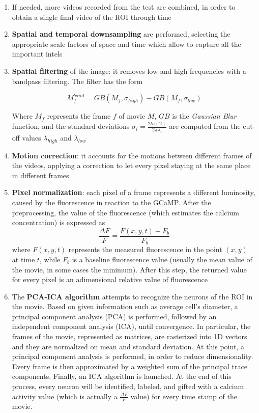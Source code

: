 \documentclass[a4paper]{article}
\begin{document}
\begin{enumerate}
	
	\item If needed, more videos recorded from the test are combined, in order to obtain a single final video of the ROI through time
	
	\item \textbf{Spatial and temporal downsampling} are performed, selecting the appropriate scale factors of space and time which allow to capture all the important intels
	
	\item \textbf{Spatial filtering} of the image: it removes low and high frequencies with a bandpass filtering. The filter has the form
	
	$$ M_f^{band} = GB(M_f,\sigma_{high}) - GB(M_f,\sigma_{low})$$
	
	Where $M_f$  represents the frame $f$ of movie $M$, $GB$ is the \textit{Gaussian Blur} function, and the standard deviations $ \sigma_i = \frac{2 ln(2)}{2 \pi \lambda_i}$ are computed from the cut-off values $ \lambda_{high}$ and $ \lambda_{low}$
	
	\item \textbf{Motion correction}: it accounts for the motions between different frames of the videos, applying a correction to let every pixel staying at the same place in different frames
	
	\item \textbf{Pixel normalization}: each pixel of a frame represents a different luminosity, caused by the fluorescence in reaction to the GCaMP. After the preprocessing, the value of the fluorescence (which estimates the calcium concentration) is expressed as 
	$$\frac{\Delta F }{F} = \frac{F(x,y,t) - F_b}{F_b}$$
	where $F(x,y,t)$ represents the measured fluorescence in the point $(x,y)$ at time $t$, while $F_b$ is a baseline fluorescence value (usually the mean value of the movie, in some cases the minimum). After this step, the returned value for every pixel is an adimensional relative value of fluorescence
	
	\item The \textbf{PCA-ICA algorithm} attempts to recognize the neurons of the ROI in the movie. Based on given information such as average cell's diameter, a principal component analysis (PCA) is performed, followed by an independent component analysis (ICA), until convergence. In particular, the frames of the movie, represented as matrices, are rasterized into 1D vectors and they are normalized on mean and standard deviation. At this point, a principal component analysis is performed, in order to reduce dimensionality. Every frame is then approximated by a weighted sum of the principal trace components. Finally, an ICA algorithm is launched. At the end of this process, every neuron will be identified, labeled, and gifted with a calcium activity value (which is actually a $\frac{\Delta F }{F}$ value) for every time stamp of the movie. 
	

\end{enumerate}
\end{document}

